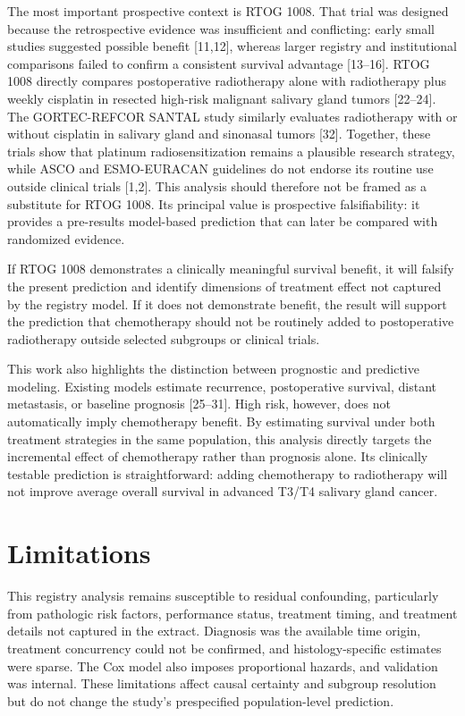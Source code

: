 \documentclass[9pt,twocolumn]{extarticle}
\begin{document}
The most important prospective context is RTOG 1008. That trial was designed because the retrospective evidence was insufficient and conflicting: early small studies suggested possible benefit [11,12], whereas larger registry and institutional comparisons failed to confirm a consistent survival advantage [13--16]. RTOG 1008 directly compares postoperative radiotherapy alone with radiotherapy plus weekly cisplatin in resected high-risk malignant salivary gland tumors [22--24]. The GORTEC-REFCOR SANTAL study similarly evaluates radiotherapy with or without cisplatin in salivary gland and sinonasal tumors [32]. Together, these trials show that platinum radiosensitization remains a plausible research strategy, while ASCO and ESMO-EURACAN guidelines do not endorse its routine use outside clinical trials [1,2]. This analysis should therefore not be framed as a substitute for RTOG 1008. Its principal value is prospective falsifiability: it provides a pre-results model-based prediction that can later be compared with randomized evidence.\par
If RTOG 1008 demonstrates a clinically meaningful survival benefit, it will falsify the present prediction and identify dimensions of treatment effect not captured by the registry model. If it does not demonstrate benefit, the result will support the prediction that chemotherapy should not be routinely added to postoperative radiotherapy outside selected subgroups or clinical trials.\par
This work also highlights the distinction between prognostic and predictive modeling. Existing models estimate recurrence, postoperative survival, distant metastasis, or baseline prognosis [25--31]. High risk, however, does not automatically imply chemotherapy benefit. By estimating survival under both treatment strategies in the same population, this analysis directly targets the incremental effect of chemotherapy rather than prognosis alone. Its clinically testable prediction is straightforward: adding chemotherapy to radiotherapy will not improve average overall survival in advanced T3/T4 salivary gland cancer.\par
\section{Limitations}
This registry analysis remains susceptible to residual confounding, particularly from pathologic risk factors, performance status, treatment timing, and treatment details not captured in the extract. Diagnosis was the available time origin, treatment concurrency could not be confirmed, and histology-specific estimates were sparse. The Cox model also imposes proportional hazards, and validation was internal. These limitations affect causal certainty and subgroup resolution but do not change the study's prespecified population-level prediction.\par
\end{document}
